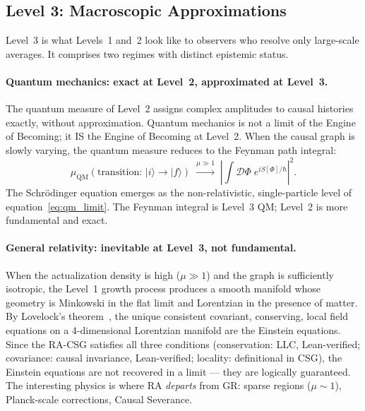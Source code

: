 \documentclass[11pt,a4paper]{article}
\theoremstyle{plain}
\theoremstyle{definition}
\theoremstyle{remark}
\newcommand{\muC}{\mu_{\mathrm{QM}}}   %
\begin{document}
\subsection{Level 3: Macroscopic Approximations}

Level~3 is what Levels~1 and~2 look like to observers who resolve
only large-scale averages. It comprises two regimes with distinct
epistemic status.

\paragraph{Quantum mechanics: exact at Level~2, approximated at Level~3.}
The quantum measure of Level~2 assigns complex amplitudes to causal histories
exactly, without approximation. Quantum mechanics is not a limit of the
Engine of Becoming; it IS the Engine of Becoming at Level~2. When the causal
graph is slowly varying, the quantum measure reduces to the Feynman path
integral:
\begin{equation}
  \muC(\text{transition: } |i\rangle \to |f\rangle)
  \;\xrightarrow{\mu \gg 1}\;
  \left|\int \mathcal{D}\Phi\; e^{iS[\Phi]/\hbar}\right|^2.
  \label{eq:qm_limit}
\end{equation}
The Schr\"{o}dinger equation emerges as the non-relativistic, single-particle
level of equation~\eqref{eq:qm_limit}. The Feynman integral is Level~3 QM;
Level~2 is more fundamental and exact.

\paragraph{General relativity: inevitable at Level~3, not fundamental.}
When the actualization density is high ($\mu \gg 1$) and the graph is
sufficiently isotropic, the Level~1 growth process produces a smooth
manifold whose geometry is Minkowski in the flat limit and Lorentzian in
the presence of matter. By Lovelock's theorem~\citep{Lovelock1971}, the
unique consistent covariant, conserving, local field equations on a
4-dimensional Lorentzian manifold are the Einstein equations. Since the
RA-CSG satisfies all three conditions (conservation: LLC, Lean-verified;
covariance: causal invariance, Lean-verified; locality: definitional in CSG),
the Einstein equations are not recovered in a limit --- they are logically
guaranteed. The interesting physics is where RA \emph{departs} from GR:
sparse regions ($\mu \sim 1$), Planck-scale corrections, Causal Severance.
\end{document}
